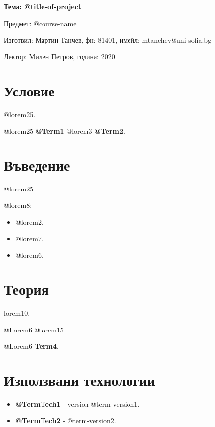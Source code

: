 \documentclass[12pt]{article}
\begin{document}
	\begin{center}
        \LARGE{\textbf{Тема: @title-of-project}}
        
        \bigskip
        \Large{Предмет: @course-name}
        
        \medskip
        \Large{Изготвил: Мартин Танчев, фн: 81401, имейл: mtanchev@uni-sofia.bg}
        
        \medskip
        \Large{Лектор: Милен Петров, година: 2020}
        
        \bigskip
	\end{center}
    
    
    \tableofcontents
    \bigskip
    \bigskip
    \newpage
  
\section{Условие} 

\noindent @lorem25.

\medskip


\noindent @lorem25  \textbf{@Term1} @lorem3 \textbf{@Term2}.

\section{Въведение}

@lorem25

\noindent @lorem8:

\begin{itemize}
    \item @lorem2.
    
    \item @lorem7.
    
    \item @lorem6.
\end{itemize}

\section{Теория}
\noindent lorem10. 

\medskip

\noindent @Lorem6  @lorem15.

\noindent @Lorem6 \textbf{Term4}.


\section{Използвани технологии}
\begin{itemize}
    \item \textbf{@TermTech1} - version @term-version1.
    
    \item \textbf{@TermTech2} - @term-version2.
\end{itemize}
\end{document}
